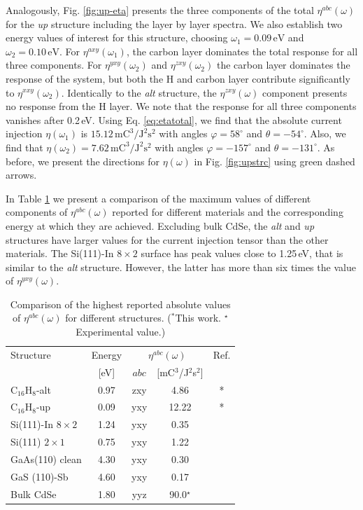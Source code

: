 \documentclass[pss]{wiley2sp} %
\begin{document}
Analogously, Fig. \ref{fig:up-eta} presents the three components of the total
$\eta^{abc}(\omega)$ for the \emph{up} structure including the layer by layer
spectra. We also establish two energy values of interest for this structure,
choosing $\omega_{1} = 0.09\,\mathrm{eV}$ and $\omega_{2} = 0.10\,\mathrm{eV}$. For
$\eta^{axy}(\omega_{1})$, the carbon layer dominates the total response for all three
components. For $\eta^{yxy}(\omega_{2})$ and $\eta^{zxy}(\omega_{2})$ the carbon layer
dominates the response of the system, but both the H and carbon layer contribute
significantly to $\eta^{xxy}(\omega_{2})$. Identically to the \emph{alt} structure,
the $\eta^{zxy}(\omega)$ component presents no response from the H layer.  We
note that the response for all three components vanishes after 0.2\,eV. Using
Eq. \eqref{eq:etatotal}, we find that the absolute current injection $\eta(\omega_{1})$
is $15.12\,\mathrm{mC}^{3}/\mathrm{J}^{2}\mathrm{s}^{2}$ with angles
$\varphi=58^{\circ}$ and $\theta=-54^{\circ}$. Also, we find that
$\eta(\omega_{2})=7.62\,\mathrm{mC}^{3}/\mathrm{J}^{2}\mathrm{s}^{2}$ with angles
$\varphi=-157^{\circ}$ and $\theta=-131^{\circ}$. As before, we present the
directions for $\eta(\omega)$ in Fig. \ref{fig:upstrc} using green dashed
arrows.

In Table \ref{tab:etacomp} we present a comparison of the maximum values of
different components of $\eta^{abc}(\omega)$ reported for different materials
and the corresponding energy at which they are achieved. Excluding bulk CdSe,
the \emph{alt} and \emph{up} structures have larger values for the current
injection tensor than the other materials. The Si(111)-In $8\times 2$ surface
has peak values close to 1.25\,eV, that is similar to the \emph{alt} structure.
However, the latter has more than six times the value of $\eta^{yxy}(\omega)$.

\begin{table}%
\sidecaption
\begin{tabular}{lcccc}
\hline
\hline
Structure & Energy &  \multicolumn{2}{c}{$\eta^{abc}(\omega)$} &  Ref.\\
\cline{3-4}
          & [eV]   & $abc$ & [mC$^{3}$/J$^{2}$s$^{2}$] \\
\hline
C$_{16}$H$_{8}$-alt     & 0.97  & zxy & 4.86  & *     \\
C$_{16}$H$_{8}$-up      & 0.09  & yxy & 12.22 & *     \\
Si(111)-In $8\times2$   & 1.24  & yxy & 0.35  & \cite{arzatePRB14}  \\
Si(111) $2\times1$      & 0.75  & yxy & 1.22  & \cite{cabellosPRB11} \\
GaAs(110) clean         & 4.30  & yxy & 0.30  & \cite{cabellosPRB11}     \\
GaS (110)-Sb            & 4.60  & yxy & 0.17  & \cite{cabellosPRB11}\\
Bulk CdSe               & 1.80  & yyz & 90.0$^{\star}$  & \cite{lamanAPL99}\\
\hline
\hline
\end{tabular}
\caption[]{%
Comparison of the highest reported absolute values of {$\eta^{abc}(\omega)$}
for different structures. ($^{*}$This work. $^{\star}$Experimental value.)}
\label{tab:etacomp}
\end{table}
\end{document}
